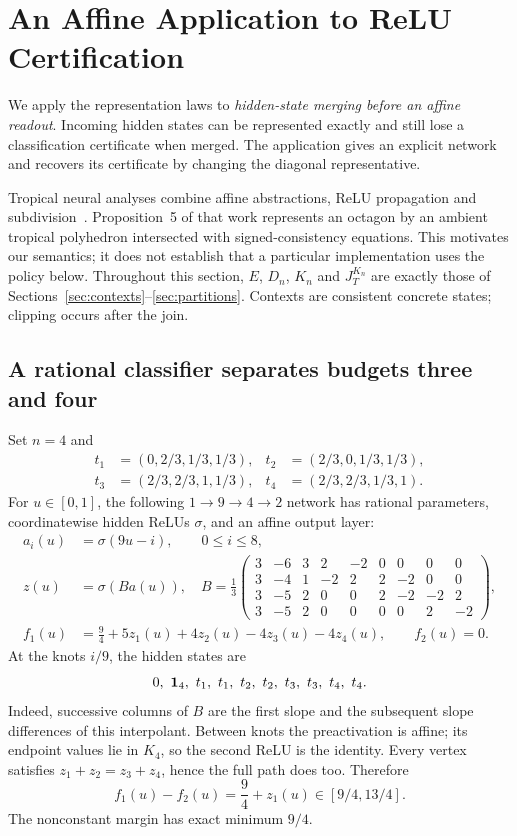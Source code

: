 \section{An Affine Application to ReLU Certification}\label{sec:relu-application}

We apply the representation laws to \emph{hidden-state merging before an affine readout}. Incoming hidden states can be represented exactly and still lose a classification certificate when merged. The application gives an explicit network and recovers its certificate by changing the diagonal representative.

Tropical neural analyses combine affine abstractions, ReLU propagation and subdivision~\cite{goubault2021}. Proposition~5 of that work represents an octagon by an ambient tropical polyhedron intersected with signed-consistency equations. This motivates our semantics; it does not establish that a particular implementation uses the policy below. Throughout this section, $E$, $D_n$, $K_n$ and $J_T^{K_n}$ are exactly those of Sections~\ref{sec:contexts}--\ref{sec:partitions}. Contexts are consistent concrete states; clipping occurs after the join.




\subsection{A rational classifier separates budgets three and four}
Set $n=4$ and
\begin{align*}
t_1&=(0,2/3,1/3,1/3),&t_2&=(2/3,0,1/3,1/3),\\
t_3&=(2/3,2/3,1,1/3),&t_4&=(2/3,2/3,1/3,1).
\end{align*}
For $u\in[0,1]$, the following $1\to9\to4\to2$ network has rational parameters, coordinatewise hidden ReLUs $\sigma$, and an affine output layer:
\begin{align}
a_i(u)&=\sigma(9u-i),\qquad 0\le i\le8,\label{eq:explicit-first}\\
z(u)&=\sigma(Ba(u)),\quad
B=\frac13\begin{pmatrix}
3&-6&3&2&-2&0&0&0&0\\
3&-4&1&-2&2&2&-2&0&0\\
3&-5&2&0&0&2&-2&-2&2\\
3&-5&2&0&0&0&0&2&-2
\end{pmatrix},\label{eq:explicit-hidden}\\
f_1(u)&=\frac94+5z_1(u)+4z_2(u)-4z_3(u)-4z_4(u),\qquad f_2(u)=0.\label{eq:explicit-head}
\end{align}
At the knots $i/9$, the hidden states are
\[
0,\ \one_4,\ t_1,\ t_1,\ t_2,\ t_2,\ t_3,\ t_3,\ t_4,\ t_4.
\]
Indeed, successive columns of $B$ are the first slope and the subsequent slope differences of this interpolant. Between knots the preactivation is affine; its endpoint values lie in $K_4$, so the second ReLU is the identity. Every vertex satisfies $z_1+z_2=z_3+z_4$, hence the full path does too. Therefore
\begin{equation}\label{eq:true-margin}
f_1(u)-f_2(u)=\frac94+z_1(u)\in[9/4,13/4].
\end{equation}
The nonconstant margin has exact minimum $9/4$.

